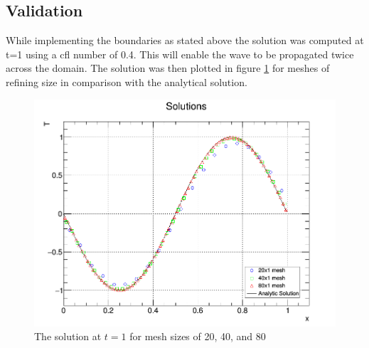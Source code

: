 \documentclass[paper=a4, fontsize=11pt, abstract=on]{scrartcl}
\numberwithin{equation}{section}		%
\numberwithin{figure}{section}			%
\numberwithin{table}{section}				%
\begin{document}
\subsection{Validation}
While implementing the boundaries as stated above the solution was computed at t=1 using a cfl number of 0.4. This will enable the wave to be propagated twice across the domain. The solution was then plotted in figure \ref{q4} for meshes of refining size in comparison with the analytical solution.

\begin{figure}[H]
\centering
\includegraphics[width=0.75\linewidth]{qq11}
\caption{The solution at $t=1$ for mesh sizes of 20, 40, and 80}
\label{q4}
\end{figure}
\end{document}
